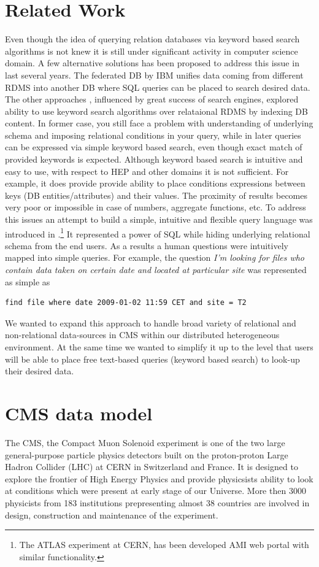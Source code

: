 \documentclass[a4paper]{jpconf}
\begin{document}
\section{Related Work\label{RelatedWork}}
Even though the idea of querying relation databases via keyword based search
algorithms is not knew it is still under significant activity in computer
science domain. A few alternative solutions has been proposed to address this issue
in last several years. The federated DB \cite{FedDB} by IBM unifies data coming 
from different RDMS into another DB where SQL queries can be placed to search desired
data. The other approaches \cite{DBXplorer, QueryAnswer}, influenced by great success
of search engines, explored ability to use keyword search algorithms over relataional RDMS
by indexing DB content. In former case, you still face a problem with understanding 
of underlying schema and imposing relational conditions in your query, while 
in later queries can be expressed via simple keyword based search, even though exact match
of provided keywords is expected. Although keyword based search is
intuitive and easy to use, with respect to HEP and other domains it is not sufficient. 
For example, it does provide provide ability to place conditions expressions between
keys (DB entities/attributes) and their values. The proximity of results becomes very poor
or impossible in case of numbers, aggregate functions, etc. To address this issues
an attempt to build a simple, intuitive and flexible query language was introduced
in \cite{DBS-QL}.\footnote{The ATLAS experiment at CERN, has been developed
AMI web portal \cite{AMI} with similar functionality.}
It represented a power of SQL while
hiding underlying relational schema from the end users. As a results
a human questions were intuitively mapped into simple queries. For example,
the question
{\it I'm looking for files who contain data taken on certain date and located at
particular site} was represented as simple as
\begin{verbatim}
find file where date 2009-01-02 11:59 CET and site = T2
\end{verbatim}
We wanted to expand this approach to handle broad variety of relational and
non-relational data-sources in CMS within our distributed heterogeneous environment.
At the same time we wanted to simplify it up to the level that users will be
able to place free text-based queries (keyword based search) to look-up their desired data.

\section{CMS data model\label{DataModel}}
The CMS, the Compact Muon Solenoid experiment \cite{CMS} 
is one of the two large general-purpose particle physics detectors built on 
the proton-proton Large Hadron Collider (LHC) at CERN in Switzerland and France. 
It is designed to explore the frontier of High Energy Physics and provide physicsists
ability to look at conditions which were present at early stage of our Universe.
More then 3000 physicists from 183 institutions prepresenting almost 
38 countries are involved in design, construction and maintenance of the experiment.
\end{document}
